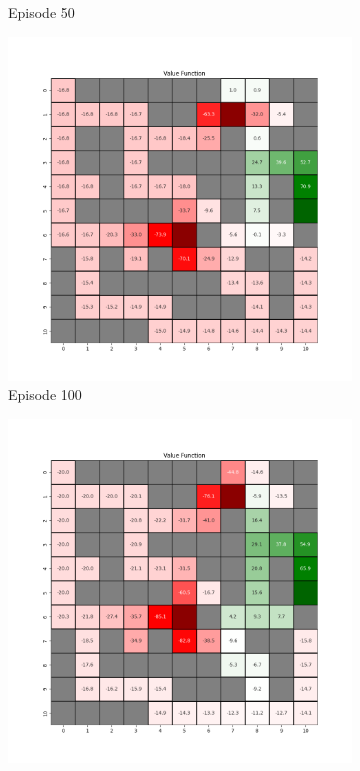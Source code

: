 \documentclass{assignment}
\begin{document}
\begin{figure}[H]
\begin{subfigure}{0.3\textwidth}
    \caption{Episode 50}
    \end{subfigure}\hfill
    \begin{subfigure}{0.3\textwidth}
        \includegraphics[width=\textwidth]{figures/value_td/epsilon_sweep/value_function_alpha_0.1_gamma_0.95_epsilon_0.5_iteration_100.png}
    \caption{Episode 100}
    \end{subfigure}
    \begin{subfigure}{0.3\textwidth}
        \includegraphics[width=\textwidth]{figures/value_td/epsilon_sweep/value_function_alpha_0.1_gamma_0.95_epsilon_0.5_iteration_1000.png}

\end{subfigure}
\end{figure}
\end{document}
